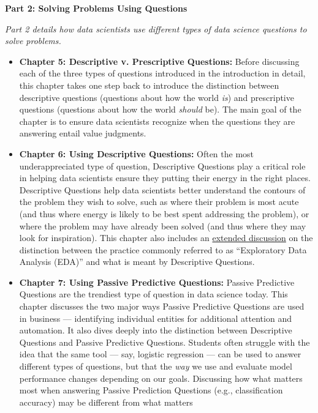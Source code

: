\documentclass[12pt]{article}
\begin{document}
\textbf{Part 2: Solving Problems Using Questions}

\emph{Part 2 details how data scientists use different types of data
science questions to solve problems.}

\begin{itemize}

\item
  \textbf{Chapter 5: Descriptive v. Prescriptive Questions:} Before
  discussing each of the three types of questions introduced in the
  introduction in detail, this chapter takes one step back to introduce
  the distinction between descriptive questions (questions about how the
  world \emph{is}) and prescriptive questions (questions about how the
  world \emph{should} be). The main goal of the chapter is to ensure
  data scientists recognize when the questions they are answering entail
  value judgments.
\item
  \textbf{Chapter 6: Using Descriptive Questions:} Often the most
  underappreciated type of question, Descriptive Questions play a
  critical role in helping data scientists ensure they putting their
  energy in the right places. Descriptive Questions help data scientists
  better understand the contours of the problem they wish to solve, such
  as where their problem is most acute (and thus where energy is likely
  to be best spent addressing the problem), or where the problem may
  have already been solved (and thus where they may look for
  inspiration). This chapter also includes an
  \href{https://ds4humans.com/30_questions/07_eda.html}{extended
  discussion} on the distinction between the practice commonly referred
  to as ``Exploratory Data Analysis (EDA)'' and what is meant by
  Descriptive Questions.
\item
  \textbf{Chapter 7: Using Passive Predictive Questions:} Passive
  Predictive Questions are the trendiest type of question in data
  science today. This chapter discusses the two major ways Passive
  Predictive Questions are used in business --- identifying individual
  entities for additional attention and automation. It also dives deeply
  into the distinction between Descriptive Questions and Passive
  Predictive Questions. Students often struggle with the idea that the
  same tool --- say, logistic regression --- can be used to answer
  different types of questions, but that the \emph{way} we use and
  evaluate model performance changes depending on our goals. Discussing
  how what matters most when answering Passive Prediction Questions
  (e.g., classification accuracy) may be different from what matters

\end{itemize}
\end{document}
